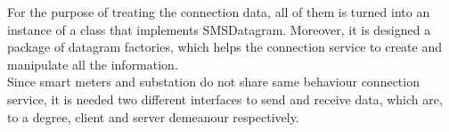 
For the purpose of treating the connection data, all of them is turned into an instance of a class that implements SMSDatagram. Moreover, it is designed a package of datagram factories, which helps the connection service to create and manipulate all the information. 
\\
Since smart meters and substation do not share same behaviour connection service, it is needed two different interfaces to send and receive data, which are, to a degree, client and server demeanour respectively.
